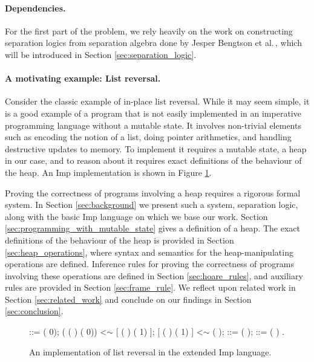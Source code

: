 \paragraph{Dependencies.}
For the first part of the problem, we rely heavily on the work on constructing separation logics from separation algebra done by Jesper Bengtson et al.\,\cite{BirkedalL:veroop-conf}, which will be introduced in Section \ref{sec:separation_logic}.


\paragraph{A motivating example: List reversal.}
Consider the classic example of in-place list reversal. While it may seem simple, it is a good example of a program that is not easily implemented in an imperative programming language without a mutable state. It involves non-trivial elements such as encoding the notion of a list, doing pointer arithmetics, and handling destructive updates to memory. To implement it requires a mutable state, a heap in our case, and to reason about it requires exact definitions of the behaviour of the heap. An Imp implementation is shown in Figure \ref{fig:list_reversal}.

Proving the correctness of programs involving a heap requires a rigorous formal system. In Section \ref{sec:background} we present such a system, separation logic, along with the basic Imp language on which we base our work. Section \ref{sec:programming_with_mutable_state} gives a definition of a heap. The exact definitions of the behaviour of the heap is provided in Section \ref{sec:heap_operations}, where syntax and semantics for the heap-manipulating operations are defined. Inference rules for proving the correctness of programs involving these operations are defined in Section \ref{sec:hoare_rules}, and auxiliary rules are provided in Section \ref{sec:frame_rule}. We reflect upon related work in Section \ref{sec:related_work} and conclude on our findings in Section \ref{sec:conclusion}.


\begin{figure}
\begin{coqdoccode}
\coqdocindent{7.00em}
 ::= ( 0);\coqdoceol
\coqdocindent{7.00em}
  ( ( ) ( 0)) \coqdoceol
\coqdocindent{10.00em}
 <$\sim$ [  ( ) ( 1) ];\coqdoceol
\coqdocindent{10.00em}
[  ( ) ( 1) ] <$\sim$ ( );\coqdoceol
\coqdocindent{10.00em}
 ::= ( );\coqdoceol
\coqdocindent{10.00em}
 ::= ( )\coqdoceol
\coqdocindent{7.00em}
.\coqdoceol
\end{coqdoccode}
\caption{An implementation of list reversal in the extended Imp language.}
\label{fig:list_reversal}
\end{figure}
